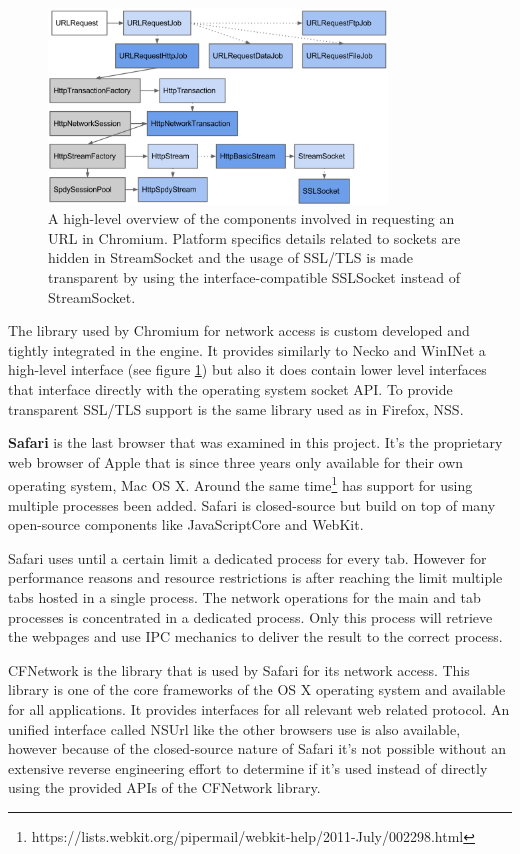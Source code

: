 \begin{figure}[h]
    \centering
    \includegraphics[width=9cm]{Images/Chrome_network.png}
    \caption{A high-level overview of the components involved in requesting an URL in Chromium. Platform specifics details related to sockets are hidden in StreamSocket and the usage of SSL/TLS is made transparent by using the interface-compatible SSLSocket instead of StreamSocket. \cite{ChromeNetwork}}
    \label{fig:chrome_network}
\end{figure}

The library used by Chromium for network access is custom developed and tightly integrated in the engine. It provides similarly to Necko and WinINet a high-level interface (see figure \ref{fig:chrome_network}) but also it does contain lower level interfaces that interface directly with the operating system socket API. To provide transparent SSL/TLS support is the same library used as in Firefox, NSS.

\textbf{Safari} is the last browser that was examined in this project. It's the proprietary web browser of Apple that is since three years only available for their own operating system, Mac OS X. Around the same time\footnote{https://lists.webkit.org/pipermail/webkit-help/2011-July/002298.html} has support for using multiple processes been added. Safari is closed-source but build on top of many open-source components like JavaScriptCore and WebKit.

Safari uses until a certain limit a dedicated process for every tab. However for performance reasons and resource restrictions is after reaching the limit multiple tabs hosted in a single process. The network operations for the main and tab processes is concentrated in a dedicated process. Only this process will retrieve the webpages and use IPC mechanics to deliver the result to the correct process. 

CFNetwork is the library that is used by Safari for its network access. This library is one of the core frameworks of the OS X operating system and available for all applications. It provides interfaces for all relevant web related protocol. An unified interface called NSUrl like the other browsers use is also available, however because of the closed-source nature of Safari it's not possible without an extensive reverse engineering effort to determine if it's used instead of directly using the provided APIs of the CFNetwork library.

